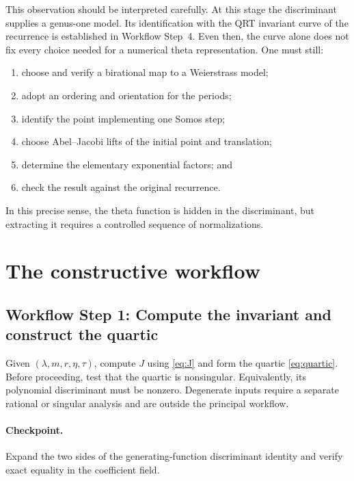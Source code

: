 \documentclass[11pt]{article}
\newcommand{\workflowstep}[1]{\subsection{Workflow Step #1}}
\newcommand{\taupar}{\tau}
\begin{document}
This observation should be interpreted carefully. At this stage the
discriminant supplies a genus-one model. Its identification with the QRT
invariant curve of the recurrence is established in Workflow Step~4. Even
then, the curve alone does not fix every choice needed for a numerical theta
representation. One must still:
\begin{enumerate}[leftmargin=2.3em]
  \item choose and verify a birational map to a Weierstrass model;
  \item adopt an ordering and orientation for the periods;
  \item identify the point implementing one Somos step;
  \item choose Abel--Jacobi lifts of the initial point and translation;
  \item determine the elementary exponential factors; and
  \item check the result against the original recurrence.
\end{enumerate}
In this precise sense, the theta function is hidden in the discriminant, but
extracting it requires a controlled sequence of normalizations.

\section{The constructive workflow}
\label{sec:workflow}

\workflowstep{1: Compute the invariant and construct the quartic}
Given $(\lambda,m,r,\eta,\taupar)$, compute $J$ using \cref{eq:J} and form the
quartic \cref{eq:quartic}. Before proceeding, test that the quartic is
nonsingular. Equivalently, its polynomial discriminant must be nonzero.
Degenerate inputs require a separate rational or singular analysis and are
outside the principal workflow.

\paragraph{Checkpoint.}
Expand the two sides of the generating-function discriminant identity and
verify exact equality in the coefficient field.
\end{document}
